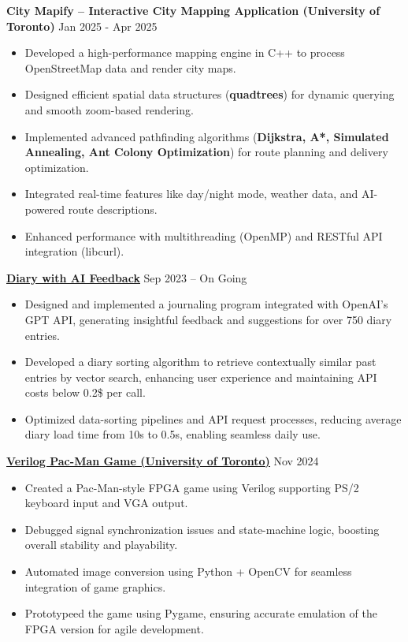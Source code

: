 \documentclass[a4paper,10pt]{article}
\begin{document}
\vspace{0.3cm}
\noindent\textbf{City Mapify – Interactive City Mapping Application (University of Toronto)} \hfill Jan 2025 - Apr 2025
\begin{itemize}[leftmargin=0.2in]
    \item Developed a high-performance mapping engine in C++ to process OpenStreetMap data and render city maps.
    \item Designed efficient spatial data structures (\textbf{quadtrees}) for dynamic querying and smooth zoom-based rendering.
    \item Implemented advanced pathfinding algorithms (\textbf{Dijkstra, A*, Simulated Annealing, Ant Colony Optimization}) for route planning and delivery optimization.
    \item Integrated real-time features like day/night mode, weather data, and AI-powered route descriptions.
    \item Enhanced performance with multithreading (OpenMP) and RESTful API integration (libcurl).
\end{itemize}


\vspace{0.3cm}
\noindent\href{https://github.com/Ken-2511/Diary-with-ChatGPT-Comment}{\uline{
\textbf{Diary with AI Feedback}}} \hfill Sep 2023 -- On Going
\begin{itemize}[leftmargin=0.2in]
    \item Designed and implemented a journaling program integrated with OpenAI’s GPT API, generating insightful feedback and suggestions for over 750 diary entries.
    \item Developed a diary sorting algorithm to retrieve contextually similar past entries by vector search, enhancing user experience and maintaining API costs below 0.2\$ per call.
    \item Optimized data-sorting pipelines and API request processes, reducing average diary load time from 10s to 0.5s, enabling seamless daily use.
\end{itemize}


\vspace{0.3cm}
\noindent\href{https://github.com/Ken-2511/ECE241-Project}{\uline{
\textbf{Verilog Pac-Man Game (University of Toronto)}}} \hfill Nov 2024
\begin{itemize}[leftmargin=0.2in]
    \item Created a Pac-Man-style FPGA game using Verilog supporting PS/2 keyboard input and VGA output.
    \item Debugged signal synchronization issues and state-machine logic, boosting overall stability and playability.
    \item Automated image conversion using Python + OpenCV for seamless integration of game graphics.
    \item Prototypeed the game using Pygame, ensuring accurate emulation of the FPGA version for agile development.
\end{itemize}
\end{document}
